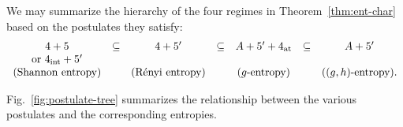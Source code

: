 \documentclass[reqno]{amsart}
\begin{document}
\begin{remark}
\label{rem:summary}
    We may summarize the hierarchy of the four regimes in Theorem~\ref{thm:ent-char} based on the postulates they satisfy:
$$
\begin{array}{ccccccc}
\begin{array}[t]{c}
4+5\\
\text{or } 4_{\mathrm{int}}+5'
\end{array}
& \subseteq &
4+5'
& \subseteq &
A+5'+4_{\rm at}
& \subseteq &
A+5'
\\[6pt]
\text{(Shannon entropy)}
&
&
\text{(R\'enyi entropy)}
&
&
\text{($g$-entropy)}
&
&
\text{($(g,h)$-entropy)} .
\end{array}
$$
\end{remark}

Fig.~\ref{fig:postulate-tree} summarizes the relationship between the various postulates and the corresponding entropies.
\end{document}
